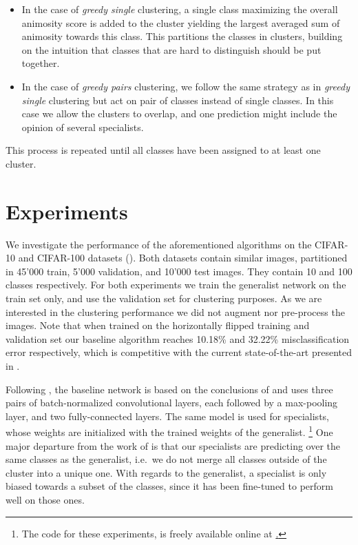 \documentclass[graybox]{styles/svmult}
\begin{document}
\begin{itemize}
\item
  In the case of \emph{greedy single} clustering, a single class
  maximizing the overall animosity score is added to the cluster
  yielding the largest averaged sum of animosity towards this class.
  This partitions the classes in clusters, building on the intuition
  that classes that are hard to distinguish should be put together.
\item
  In the case of \emph{greedy pairs} clustering, we follow the same
  strategy as in \emph{greedy single} clustering but act on pair of
  classes instead of single classes. In this case we allow the clusters
  to overlap, and one prediction might include the opinion of several
  specialists.
\end{itemize}

This process is repeated until all classes have been assigned to at
least one cluster.

\section{Experiments}\label{experiments}

We investigate the performance of the aforementioned algorithms on the
CIFAR-10 and CIFAR-100 datasets (\cite{cifar}). Both datasets contain
similar images, partitioned in 45'000 train, 5'000 validation, and
10'000 test images. They contain 10 and 100 classes respectively. For
both experiments we train the generalist network on the train set only,
and use the validation set for clustering purposes. As we are interested
in the clustering performance we did not augment nor pre-process the
images. Note that when trained on the horizontally flipped training and
validation set our baseline algorithm reaches 10.18\% and 32.22\%
misclassification error respectively, which is competitive with the
current state-of-the-art presented in \cite{allcnn}.

Following \cite{binaryconnect}, the baseline network is based on the
conclusions of \cite{vgg} and uses three pairs of batch-normalized
convolutional layers, each followed by a max-pooling layer, and two
fully-connected layers. The same model is used for specialists, whose
weights are initialized with the trained weights of the generalist.
\footnote{The code for these experiments, is freely available online at
  \href{http://www.github.com/seba-1511/specialists}.}
One major departure from the work of \cite{darkknowledge} is that our
specialists are predicting over the same classes as the generalist,
i.e.~we do not merge all classes outside of the cluster into a unique
one. With regards to the generalist, a specialist is only biased towards
a subset of the classes, since it has been fine-tuned to perform well on
those ones.
\end{document}
